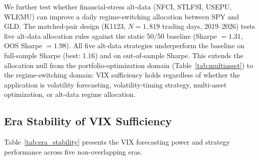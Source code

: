 \documentclass[12pt,a4paper]{article}
\begin{document}
We further test whether financial-stress alt-data (NFCI, STLFSI, USEPU, WLEMU) can improve a daily regime-switching allocation between SPY and GLD. The matched-pair design (K1123, $N = 1{,}819$ trading days, 2019--2026) tests five alt-data allocation rules against the static 50/50 baseline (Sharpe $= 1.31$, OOS Sharpe $= 1.98$). All five alt-data strategies underperform the baseline on full-sample Sharpe (best: $1.16$) and on out-of-sample Sharpe. This extends the allocation null from the portfolio-optimization domain (Table~\ref{tab:multiasset}) to the regime-switching domain: VIX sufficiency holds regardless of whether the application is volatility forecasting, volatility-timing strategy, multi-asset optimization, or alt-data regime allocation.

\subsection{Era Stability of VIX Sufficiency}

Table~\ref{tab:era_stability} presents the VIX forecasting power and strategy performance across five non-overlapping eras.
\end{document}
